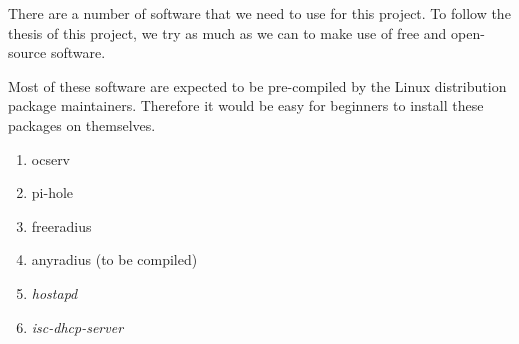 \documentclass[12pt]{article}
\begin{document}
There are a number of software that we need to use for this project. To follow the thesis of this project, we try as much as we can to make use of free and open-source software.

Most of these software are expected to be pre-compiled by the Linux distribution package maintainers. Therefore it would be easy for beginners to install these packages on themselves.

\begin{enumerate}
\item ocserv
\item pi-hole
\item freeradius
\item anyradius (to be compiled)
\item \textit{hostapd}
\item \textit{isc-dhcp-server}
\end{enumerate}
\end{document}
